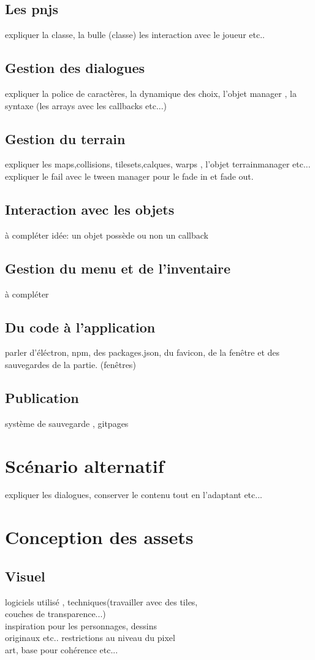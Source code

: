 \documentclass[11pt]{article}
\begin{document}
\subsection{Les pnjs}
expliquer la classe, la bulle (classe) 
les interaction avec le joueur etc..
\subsection{Gestion des dialogues}
expliquer la police de caractères, la dynamique des choix, l'objet manager , la syntaxe (les arrays avec les callbacks etc...)
\subsection{Gestion du terrain}
expliquer les maps,collisions, tilesets,calques, warps , l'objet terrainmanager etc... expliquer le fail avec le tween manager pour le fade in et fade out.
\subsection{Interaction avec les objets}
à compléter idée: un objet possède ou non un callback 
\subsection{Gestion du menu et de l'inventaire}
à compléter
\subsection{Du code à l'application}
parler d'éléctron, npm, des packages.json, du favicon, de la fenêtre et des sauvegardes de la partie. (fenêtres)
\subsection{Publication}
système de sauvegarde , gitpages
\section{Scénario alternatif}
expliquer les dialogues, conserver le contenu tout en l'adaptant etc...
\section{Conception des assets}
\subsection{Visuel}
logiciels utilisé , techniques(travailler avec des tiles, \\ couches de transparence...)\\ inspiration pour les personnages, dessins\\ originaux etc.. restrictions au niveau du pixel\\ art, base pour cohérence etc...
\end{document}
